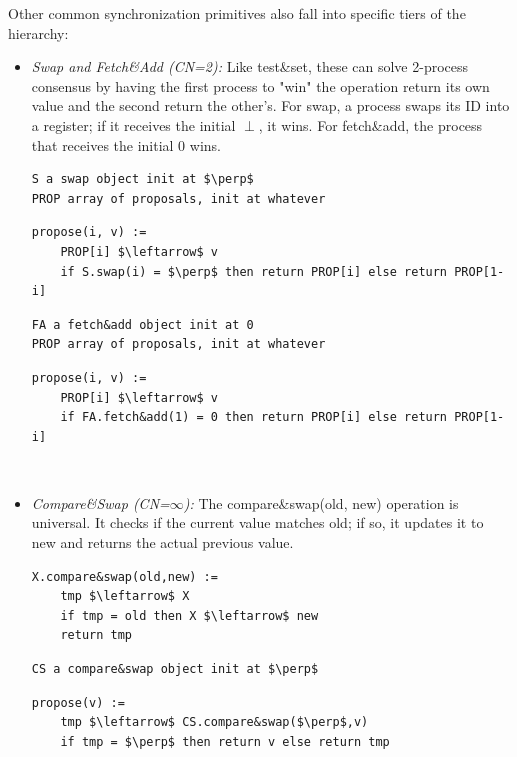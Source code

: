 Other common synchronization primitives also fall into specific tiers of the hierarchy:
\begin{itemize}
    \item \textit{Swap and Fetch\&Add (CN=2):} Like test\&set, these can solve 2-process consensus by having the first process to "win" the operation return its own value and the second return the other's. For swap, a process swaps its ID into a register; if it receives the initial $\perp$, it wins. For fetch\&add, the process that receives the initial 0 wins.

\begin{minipage}{\textwidth}
\begin{lstlisting}[mathescape]
S a swap object init at $\perp$
PROP array of proposals, init at whatever
\end{lstlisting}
\begin{lstlisting}[mathescape]
propose(i, v) :=
    PROP[i] $\leftarrow$ v
    if S.swap(i) = $\perp$ then return PROP[i] else return PROP[1-i]
\end{lstlisting}
\begin{lstlisting}[mathescape]
FA a fetch&add object init at 0
PROP array of proposals, init at whatever
\end{lstlisting}
\begin{lstlisting}[mathescape]
propose(i, v) :=
    PROP[i] $\leftarrow$ v
    if FA.fetch&add(1) = 0 then return PROP[i] else return PROP[1-i]
\end{lstlisting}
\end{minipage}\\
    
    \item \textit{Compare\&Swap (CN=$\infty$):} The compare\&swap(old, new) operation is universal. It checks if the current value matches old; if so, it updates it to new and returns the actual previous value.

\begin{minipage}{\textwidth}
\begin{lstlisting}[mathescape]
X.compare&swap(old,new) :=
    tmp $\leftarrow$ X
    if tmp = old then X $\leftarrow$ new
    return tmp
\end{lstlisting}
\begin{lstlisting}[mathescape]
CS a compare&swap object init at $\perp$
\end{lstlisting}
\begin{lstlisting}[mathescape]
propose(v) :=
    tmp $\leftarrow$ CS.compare&swap($\perp$,v)
    if tmp = $\perp$ then return v else return tmp
\end{lstlisting}
\end{minipage}\\
    
\end{itemize}
    
